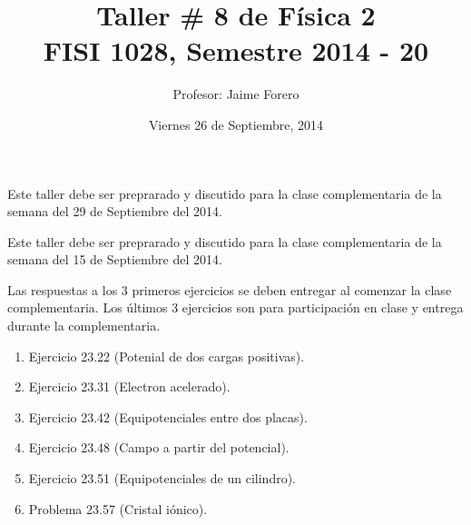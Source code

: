 \documentclass{article}
\title{Taller \# 8 de F\'isica 2\\ FISI 1028, Semestre 2014 - 20}
\author{Profesor: Jaime Forero}
\date{Viernes 26 de Septiembre, 2014}
\begin{document}
\maketitle
\thispagestyle{empty}

\noindent

Este taller debe ser preprarado y discutido para la clase
complementaria de la semana del 29 de Septiembre del 2014.



Este taller debe ser preprarado y discutido para la clase
complementaria de la semana del 15 de Septiembre del 2014.

Las respuestas a los 3 primeros ejercicios se deben entregar al comenzar la
clase complementaria. Los \'ultimos 3 ejercicios son para
participaci\'on en clase y entrega durante la complementaria. 

\begin{enumerate}

\item
Ejercicio 23.22 (Potenial de dos cargas positivas).

\item 
Ejercicio 23.31 (Electron acelerado).

\item 
Ejercicio 23.42 (Equipotenciales entre dos placas).

\item
Ejercicio 23.48 (Campo a partir del potencial).

\item
Ejercicio 23.51 (Equipotenciales de un cilindro).

\item 
Problema 23.57 (Cristal i\'onico).

\end{enumerate}
\end{document}
